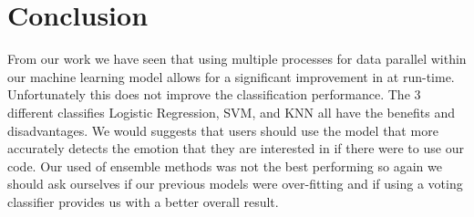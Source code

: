 \section{Conclusion}
\label{sec:conclusion}
From our work we have seen that using multiple processes
for data parallel within our machine learning model allows for
a significant improvement in at run-time.
Unfortunately this does not improve the classification performance.
The 3 different classifies Logistic Regression,
SVM, and KNN
all have the benefits and disadvantages.
We would suggests that users should use the model that more accurately detects
the emotion that they are interested in if there were to use our code.
Our used of ensemble methods was not the best performing so again we should
ask ourselves if our previous models were over-fitting and if using a voting
classifier provides us with a better overall result.

